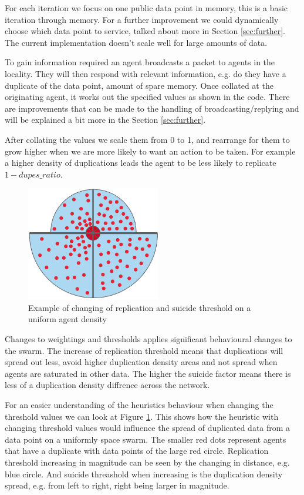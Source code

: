 \documentclass{UoYCSproject}
\begin{document}
For each iteration we focus on one public data point in memory, this is a basic iteration through memory. 
For a further improvement we could dynamically choose which data point to service, talked about more in Section \ref{sec:further}. 
The current implementation doesn’t scale well for large amounts of data.


To gain information required an agent broadcasts a packet to agents in the locality. 
They will then respond with relevant information, e.g. do they have a duplicate of the data point, amount of spare memory. 
Once collated at the originating agent, it works out the specified values as shown in the code.
There are improvements that can be made to the handling of broadcasting/replying and will be explained a bit more in the Section \ref{sec:further}.

After collating the values we scale them from 0 to 1, and rearrange for them to grow higher when we are more likely to want an action to be taken.
For example a higher density of duplications leads the agent to be less likely to replicate $1-dupes\_ratio$.

\begin{figure}[htb]
\label{fig:changing}
\begin{center}
\centering
\includegraphics[height=5cm]{"./ExplanationImgs/planned_changes.png"}
\caption{Example of changing of replication and suicide threshold on a uniform agent density}
\end{center}
\end{figure}

Changes to weightings and thresholds applies significant behavioural changes to the swarm.
The increase of replication threshold means that duplications will spread out less, avoid higher duplication density areas and not spread when agents are saturated in other data.
The higher the suicide factor means there is less of a duplication density diffrence across the network.

For an easier understanding of the heuristics behaviour when changing the threshold values we can look at Figure \ref{fig:changing}. 
This shows how the heuristic with changing threshold values would influence the spread of duplicated data from a data point on a uniformly space swarm. 
The smaller red dots represent agents that have a duplicate with data points of the large red circle. 
Replication threshold increasing in magnitude can be seen by the changing in distance, e.g. blue circle. 
And suicide threashold when increasing is the duplication density spread, e.g. from left to right, right being larger in magnitude.
\end{document}
